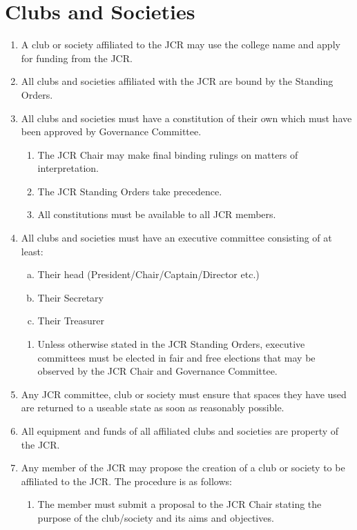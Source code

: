 \documentclass[12pt]{article}
\begin{document}
\section{Clubs and Societies}
\begin{enumerate}
    \item A club or society affiliated to the JCR may use the college name and apply for funding from the JCR.
    \item All clubs and societies affiliated with the JCR are bound by the Standing Orders.
    \item All clubs and societies must have a constitution of their own which must have been approved by Governance Committee.
    \begin{enumerate}
        \item The JCR Chair may make final binding rulings on matters of interpretation.
        \item The JCR Standing Orders take precedence.
        \item All constitutions must be available to all JCR members.
    \end{enumerate}
    \item All clubs and societies must have an executive committee consisting of at least:
    \begin{enumerate}[(a)]
        \item Their head (President/Chair/Captain/Director etc.)
        \item Their Secretary
        \item Their Treasurer
    \end{enumerate}
    \begin{enumerate}
        \item Unless otherwise stated in the JCR Standing Orders, executive committees must be elected in fair and free elections that may be observed by the JCR Chair and Governance Committee.
    \end{enumerate}
    \item Any JCR committee, club or society must ensure that spaces they have used are returned to a useable state as soon as reasonably possible.
    \item All equipment and funds of all affiliated clubs and societies are property of the JCR.
    \item Any member of the JCR may propose the creation of a club or society to be affiliated to the JCR. The procedure is as follows:
    \begin{enumerate}
        \item The member must submit a proposal to the JCR Chair stating the purpose of the club/society and its aims and objectives.

\end{enumerate}
\end{enumerate}
\end{document}
